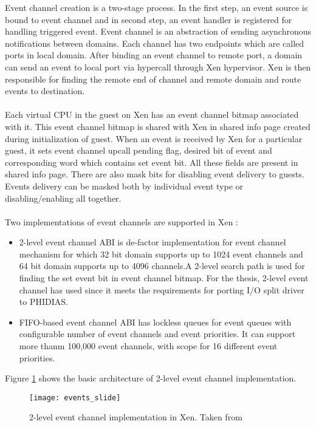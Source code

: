 Event channel creation is a two-stage process. In the first step, an event source is bound to event channel and in second step, an event handler is registered for handling triggered event. Event channel is an abstraction of sending asynchronous notifications between domains. Each channel has two endpoints which are called ports in local domain. After binding an event channel to remote port, a domain can send an event to local port via hypercall through Xen hypervisor. Xen is then responsible for finding the remote end of channel and remote domain and route events to destination.
\\
\\
Each virtual CPU in the guest on Xen has an event channel bitmap associated with it. This event channel bitmap is shared with Xen in shared info page created during initialization of guest. When an event is received by Xen for a particular guest, it sets event channel upcall pending flag, desired bit of event and corresponding word which contains set event bit. All these fields are present in shared info page. There are also mask bits for disabling event delivery to guests. Events delivery can be masked both by individual event type or disabling/enabling all together.
\\
\\
Two implementations of event channels are supported in Xen \cite{xen_events}:
\begin{itemize}
	\item 2-level event channel ABI is de-factor implementation for event channel mechanism for which 32 bit domain supports up to 1024 event channels and 64 bit domain supports up to 4096 channels.A 2-level search path is used for finding the set event bit in event channel bitmap. For the thesis, 2-level event channel has used since it meets the requirements for porting I/O split driver to PHIDIAS.
	\item FIFO-based event channel ABI has lockless queues for event queues with configurable number of event channels and event priorities. It can support more thanm 100,000 event channels, with scope for  16 different event priorities.
\end{itemize}
Figure \ref{events_slide} shows the basic architecture of 2-level event channel implementation.

\begin{figure}[!htbp]
	\centering
	\texttt{[image: events\_slide]}
	\caption{2-level event channel implementation in Xen. Taken from \cite{events_slide}}
	\label{events_slide}
\end{figure}
